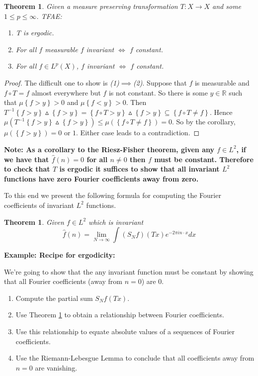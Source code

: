 \documentclass[11pt]{article}
\newcommand{\symd}{\vartriangle}
\newcommand{\R}{\mathbb{R}}
\newenvironment{note}
	{\begin{mdframed}[backgroundcolor=white, linecolor=RubineRed, roundcorner=5pt, linewidth=1pt]\bfseries{Note:}\normalfont}
	{\end{mdframed}}
\newenvironment{eg}
	{\begin{mdframed}[backgroundcolor=mylg,roundcorner=5pt,linewidth=0pt]\bfseries{Example:}\normalfont}
	{\end{mdframed}}
\newtheorem{theorem}[prop]{Theorem}
\begin{document}
\begin{theorem}
Given a measure preserving transformation $T:X\to X$ and some $1\leq p\leq\infty$. TFAE:
\begin{enumerate}
	\item T is ergodic.
	\item For all $f$ measurable $f$ invariant $\iff$ $f$ constant.
	\item For all $f\in L^p(X)$, $f$ invariant $\iff$ $f$ constant.
\end{enumerate}
\end{theorem}

\begin{proof}
The difficult one to show is \textit{(1)}$\implies$\textit{(2)}.
Suppose that $f$ is measurable and $f\circ T = f$ almost everywhere but $f$ is not constant.
So there is some $y\in \R$ such that $\mu\left\{ f > y\right\}>0$ and $\mu\left\{ f < y\right\}>0$.
Then $T^{-1}\left\{ f > y \right\}\symd \left\{ f > y\right\} = \left\{ f \circ T > y\right\} \symd \left\{ f > y \right\} \subseteq \left\{ f\circ T \neq f\right\}$.
Hence $\mu(T^{-1}\left\{ f > y\right\} \symd \left\{ f>y\right\}) \leq \mu(\left\{ f \circ T \neq f\right\}) = 0$.
So by the corollary, $\mu(\left\{ f > y\right\}) = 0$ or $1$.
Either case leads to a contradiction.
\end{proof}

\begin{note}
	As a corollary to the Riesz-Fisher theorem, given any $f\in L^2$, if we have that $\hat{f}(n)=0$ for all $n\neq 0$ then $f$ must be constant.
Therefore to check that $T$ is ergodic it suffices to show that all invariant $L^2$ functions have zero Fourier coefficients away from zero.
\end{note}
To this end we present the following formula for computing the Fourier coefficients of invariant $L^2$ functions.
\begin{theorem}
\label{th:coeffcompute}
Given $f\in L^2$ which is invariant
$$\hat{f}(n)=\lim_{N\to\infty}\int (S_Nf)(Tx)e^{-2\pi i n\cdot x}dx$$
\end{theorem}

\begin{eg}
	\textbf{Recipe for ergodicity:}

	We're going to show that the any invariant function must be constant by showing that all Fourier coefficients (away from $n=0$) are $0$.

	\begin{enumerate}
		\item Compute the partial sum $S_Nf(Tx)$.
		\item Use Theorem \ref{th:coeffcompute} to obtain a relationship between Fourier coefficients.
		\item Use this relationship to equate absolute values of a sequences of Fourier coefficients.
		\item Use the Riemann-Lebesgue Lemma to conclude that all coefficients away from $n=0$ are vanishing.
	\end{enumerate}
\end{eg}
\end{document}
